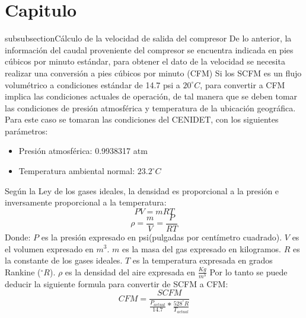 

\chapter{Capitulo}

subsubsection{C\'alculo de la velocidad de salida del compresor}
De lo anterior, la informaci\'on del caudal proveniente del compresor se encuentra indicada en pies c\'ubicos por minuto estándar, para obtener el dato de la velocidad se necesita realizar una conversi\'on a pies cúbicos por minuto (CFM)
\newline
Si los SCFM es un flujo volum\'etrico a condiciones estándar de 14.7 psi a $20^\circ C$, para convertir a CFM implica las condiciones actuales de operaci\'on, de tal manera que se deben tomar las condiciones de presi\'on atmosférica y temperatura de la ubicación geográfica. Para este caso se tomaran las condiciones del CENIDET, con los siguientes parámetros:
\begin{itemize}
	\item Presión atmosférica: 0.9938317 atm
	\item Temperatura ambiental normal: $23.2^\circ C$
\end{itemize}
Según la Ley de los gases ideales, la densidad es proporcional a la presión e inversamente proporcional a la temperatura\cite{Cengel2022}:
\begin{equation}
	PV=mRT
\end{equation}
\begin{equation}
	\rho=\frac{m}{V}=\frac{P}{RT}
\end{equation}
Donde:
\newline
$P$ es la presión expresado en psi(pulgadas por centímetro cuadrado).
\newline
$V$ es el volumen expresado en $m^3$.
\newline
$m$ es la masa del gas expresado en kilogramos.
\newline
$R$ es la constante de los gases ideales.
\newline
$T$ es la temperatura expresada en grados Rankine ($^\circ R$).
\newline
$\rho$ es la densidad del aire expresada en $\frac{Kg}{m^3}$
\newline
Por lo tanto se puede deducir la siguiente formula para convertir de SCFM a CFM:
\begin{equation}
	CFM=\frac{SCFM}{\frac{P_{actual}}{14.7}*\frac{528^\circ R}{T_{actual}}}
\end{equation}
